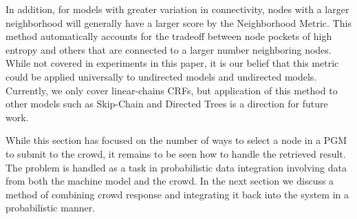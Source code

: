In addition, for models with greater variation in connectivity, nodes with a larger neighborhood will generally have a larger score by the Neighborhood Metric.  This method automatically accounts for the tradeoff between node pockets of high entropy and others that are connected to a larger number neighboring nodes.  While not covered in experiments in this paper, it is our belief that this metric could be applied universally to undirected models and undirected models.  Currently, we only cover linear-chains CRFs, but application of this method to other models such as Skip-Chain and Directed Trees is a direction for future work.

While this section has focused on the number of ways to select a node in a PGM to submit to the crowd, it remains to be seen how to handle the retrieved result.  The problem is handled as a task in probabilistic data integration involving data from both the machine model and the crowd.  In the next section we discuss a method of combining crowd response and integrating it back into the system in a probabilistic manner.

